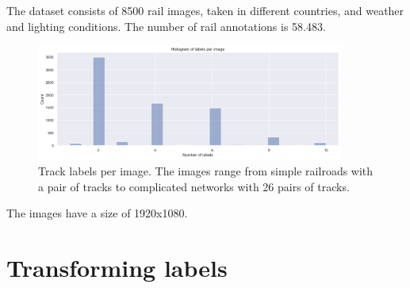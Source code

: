 \documentclass[Master,MDS,english]{BASE/twbook} %
\begin{document}
The dataset consists of 8500 rail images, taken in different countries, and weather and lighting conditions. The number of rail annotations is 58.483.



\begin{figure}[h]
\centering
\includegraphics[width=0.9\textwidth]{images/datasets/db/labels_per_image}
\caption{Track labels per image. The images range from simple railroads with a pair of tracks to complicated networks with 26 pairs of tracks. }
\label{fig:labels_per_image}
\end{figure}




The images have a size of 1920x1080. 












\section{Transforming labels}
\end{document}
